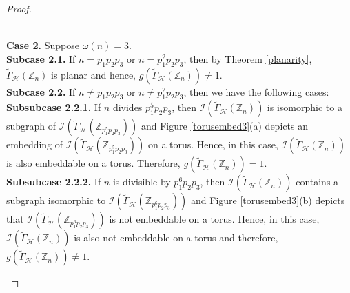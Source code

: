 \documentclass[11pt,a4paper]{article}
\theoremstyle{definition}
\theoremstyle{remark}
\begin{document}
\begin{proof}
\begin{figure}[htbp!]
{}
		\caption{}
		\label{torusembed2}
	\end{figure}\\
	\noindent\textbf{Case 2.} Suppose $\omega(n)  = 3$.\\
\textbf{Subcase 2.1.} If $n=p_1p_2p_3$ or $n=p_1^2p_2p_3$, then by Theorem \ref{planarity}, $\tilde{\Gamma}_\mathcal{H}(\mathbb{Z}_n)$ is planar and hence, $g(\tilde{\Gamma}_\mathcal{H}(\mathbb{Z}_n)) \neq 1$.\\
\textbf{Subcase 2.2.}  If $n \neq p_1p_2p_3$ or $n \neq p_1^2p_2p_3$, then we have the following cases:\\
 \noindent \textbf{Subsubcase 2.2.1.} If $n$ divides $p_1^5p_2p_3$, then $\mathcal{I}(\tilde{\Gamma}_\mathcal{H}(\mathbb{Z}_n))$ is  isomorphic to a subgraph of  $\mathcal{I}(\tilde{\Gamma}_\mathcal{H}(\mathbb{Z}_{p_1^5p_2p_3}))$ and Figure \ref{torusembed3}(a)  depicts an embedding of $\mathcal{I}(\tilde{\Gamma}_\mathcal{H}(\mathbb{Z}_{p_1^5p_2p_3}))$  on a torus.  Hence, in this case,  $\mathcal{I}(\tilde{\Gamma}_\mathcal{H}(\mathbb{Z}_n))$ is also embeddable on a torus. Therefore, $g(\tilde{\Gamma}_\mathcal{H}(\mathbb{Z}_n)) = 1$.\\
 \textbf{Subsubcase 2.2.2.} If $n$ is divisible by  $p_1^6p_2p_3$, then $\mathcal{I}(\tilde{\Gamma}_\mathcal{H}(\mathbb{Z}_n))$ contains a subgraph isomorphic to $\mathcal{I}(\tilde{\Gamma}_\mathcal{H}(\mathbb{Z}_{p_1^6p_2p_3}))$ and Figure \ref{torusembed3}(b) depicts that  $\mathcal{I}(\tilde{\Gamma}_\mathcal{H}(\mathbb{Z}_{p_1^6p_2p_3}))$  is not embeddable on a torus. Hence, in this case,  $\mathcal{I}(\tilde{\Gamma}_\mathcal{H}(\mathbb{Z}_n))$ is also not embeddable on a torus and therefore, $g(\tilde{\Gamma}_\mathcal{H}(\mathbb{Z}_n)) \neq  1$.
 \begin{figure}[htbp!]
 	\centering
\end{figure}
\end{proof}
\end{document}
